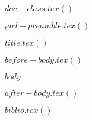 
%

$doc-class.tex()$


\usepackage{times,latexsym}
\usepackage{url}
\usepackage[T1]{fontenc}
\usepackage{graphicx}

$_tacl-preamble.tex()$


$title.tex()$



$before-body.tex()$

$body$

$after-body.tex()$

$biblio.tex()$





